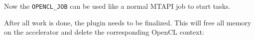 Now the \lstinline|OPENCL_JOB| can be used like a normal MTAPI job to start tasks.

After all work is done, the plugin needs to be finalized. This will free all memory on the accelerator and delete the corresponding OpenCL context:
%
\\
%
